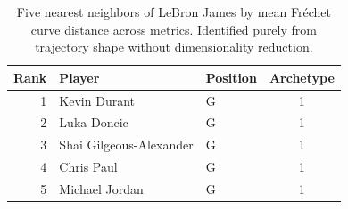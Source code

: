 \begin{table}[htbp]
  \centering\small
  \begin{tabular}{rllc}
    \toprule
    Rank & Player & Position & Archetype \\
    \midrule
    1 & Kevin Durant & G & 1 \\
    2 & Luka Doncic & G & 1 \\
    3 & Shai Gilgeous-Alexander & G & 1 \\
    4 & Chris Paul & G & 1 \\
    5 & Michael Jordan & G & 1 \\
    \bottomrule
  \end{tabular}
  \caption{Five nearest neighbors of LeBron James by mean Fr\'{e}chet curve distance across metrics. Identified purely from trajectory shape without dimensionality reduction.}
  \label{tab:LeBron_James_frechet_curve_neighbors}
\end{table}

